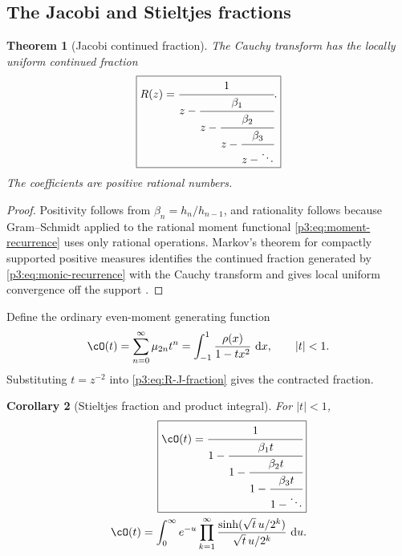 \documentclass[11pt,oneside]{article}
\newtheorem{theorem}{Theorem}[section]
\newtheorem{corollary}[theorem]{Corollary}
\theoremstyle{definition}
\newcommand{\dd}{\,\mathrm d}
\begin{document}
\subsection{The Jacobi and Stieltjes fractions}

\begin{theorem}[Jacobi continued fraction]\label{p3:thm:J-fraction}
The Cauchy transform has the locally uniform continued fraction
\begin{equation}
 \boxed{
 R(z)=\cfrac{1}{z-\cfrac{\beta_1}{z-\cfrac{\beta_2}{z-
           \cfrac{\beta_3}{z-\ddots}}}}.
 }                                                           \label{p3:eq:R-J-fraction}
\end{equation}
The coefficients are positive rational numbers.
\end{theorem}

\begin{proof}
Positivity follows from \(\beta_n=h_n/h_{n-1}\), and rationality follows because
Gram--Schmidt applied to the rational moment functional \eqref{p3:eq:moment-recurrence}
uses only rational operations.  Markov's theorem for compactly supported positive measures
identifies the continued fraction generated by \eqref{p3:eq:monic-recurrence} with the Cauchy
transform and gives local uniform convergence off the support \cite{p3:VanAssche1993,p3:SimonOPRL}.
\end{proof}

Define the ordinary even-moment generating function
\begin{equation}
 \cO(t)=\sum_{n=0}^{\infty}\mu_{2n}t^n
 =\int_{-1}^{1}\frac{\rho(x)}{1-tx^2}\,\dd x,
 \qquad |t|<1.                                               \label{p3:eq:O-def}
\end{equation}
Substituting \(t=z^{-2}\) into \eqref{p3:eq:R-J-fraction} gives the contracted fraction.

\begin{corollary}[Stieltjes fraction and product integral]\label{p3:cor:S-fraction}
For \(|t|<1\),
\begin{align}
 \boxed{
 \cO(t)=\cfrac{1}{1-\cfrac{\beta_1t}{1-\cfrac{\beta_2t}{1-
               \cfrac{\beta_3t}{1-\ddots}}}}
 }                                                           \label{p3:eq:O-S-fraction}\\
 \cO(t)=\int_0^{\infty}e^{-u}
 \prod_{k=1}^{\infty}
 \frac{\sinh(\sqrt t\,u/2^k)}{\sqrt t\,u/2^k}\,\dd u.    \label{p3:eq:O-product-integral}
\end{align}
\end{corollary}
\end{document}
